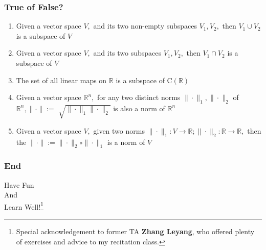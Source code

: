 \documentclass[10pt, t]{beamer}
\begin{document}
\begin{frame}
    \frametitle{True of False?}

    \begin{enumerate}
        \item 
        Given a vector space $V,$ and its two non-empty subspaces $V_{1}, V_{2},$ then $V_{1} \cup V_{2}$ is a subspace of $V$
        \item
        Given a vector space $V,$ and its two subspaces $V_{1}, V_{2},$ then $V_{1} \cap V_{2}$ is a subspace of $V$
        \item
        The set of all linear maps on $\mathbb{R}$ is a subspace of $\mathrm{C}(\mathbb{R})$
        \item
        Given a vector space $\mathbb{R}^{n},$ for any two distinct norms $\|\cdot\|_{1},\|\cdot\|_{2}$ of $\mathbb{R}^{n},\|\cdot\|:=$ $\sqrt{\|\cdot\|_{1}\|\cdot\|_{2}}$ is also a norm of $\mathbb{R}^{n}$
        \item
        Given a vector space $V,$ given two norms $\|\cdot\|_{1}: V \rightarrow \mathbb{R} ;\|\cdot\|_{2}: \mathbb{R} \rightarrow \mathbb{R},$ then the $\|\cdot\|:=\|\cdot\|_{2} \circ\|\cdot\|_{1}$ is a norm of $V$
    \end{enumerate}

\end{frame}

\begin{frame}
    \frametitle{End}
    \vspace{2.2cm}
    \begin{center}
        \Large
        Have Fun \\
        And \\
        Learn Well!\footnote[frame]{Special acknowledgement to former TA \textbf{Zhang Leyang}, who offered plenty of exercises and advice to my recitation class.}
    \end{center}
\end{frame}
\end{document}
